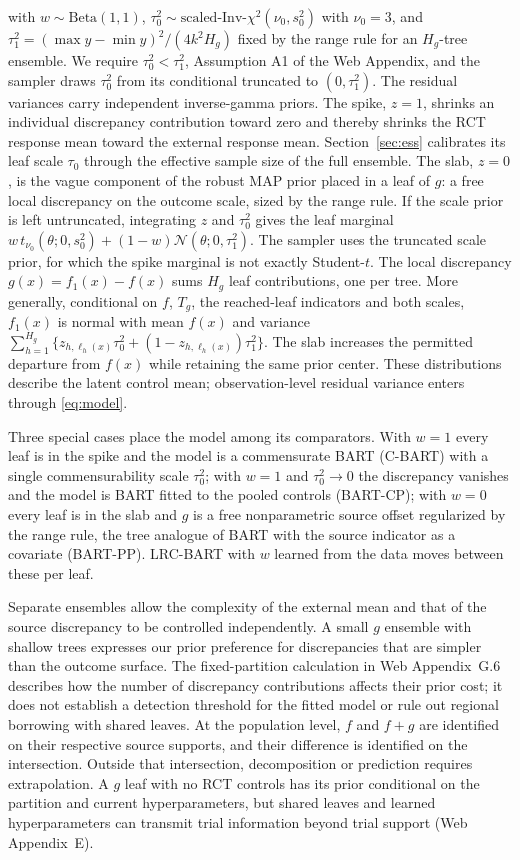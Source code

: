 \documentclass[11pt]{article}
\newcommand{\Normal}{\mathcal{N}}
\theoremstyle{definition}
\theoremstyle{plain}
\begin{document}
with $w\sim\mathrm{Beta}(1,1)$, $\tau_0^2\sim\text{scaled-Inv-}\chi^2(\nu_0,s_0^2)$ with $\nu_0=3$, and $\tau_1^2=(\max y-\min y)^2/(4k^2H_g)$ fixed by the range rule for an $H_g$-tree ensemble. We require $\tau_0^2<\tau_1^2$, Assumption A1 of the Web Appendix, and the sampler draws $\tau_0^2$ from its conditional truncated to $(0,\tau_1^2)$. The residual variances carry independent inverse-gamma priors. The spike, $z=1$, shrinks an individual discrepancy contribution toward zero and thereby shrinks the RCT response mean toward the external response mean. Section~\ref{sec:ess} calibrates its leaf scale $\tau_0$ through the effective sample size of the full ensemble. The slab, $z=0$, is the vague component of the robust MAP prior placed in a leaf of $g$: a free local discrepancy on the outcome scale, sized by the range rule. If the scale prior is left untruncated, integrating $z$ and $\tau_0^2$ gives the leaf marginal $w\,t_{\nu_0}(\theta;0,s_0^2)+(1-w)\Normal(\theta;0,\tau_1^2)$. The sampler uses the truncated scale prior, for which the spike marginal is not exactly Student-$t$. The local discrepancy $g(x)=f_1(x)-f(x)$ sums $H_g$ leaf contributions, one per tree. More generally, conditional on $f$, $T_g$, the reached-leaf indicators and both scales, $f_1(x)$ is normal with mean $f(x)$ and variance $\sum_{h=1}^{H_g}\{z_{h,\ell_h(x)}\tau_0^2+(1-z_{h,\ell_h(x)})\tau_1^2\}$. The slab increases the permitted departure from $f(x)$ while retaining the same prior center. These distributions describe the latent control mean; observation-level residual variance enters through \eqref{eq:model}.

Three special cases place the model among its comparators. With $w=1$ every leaf is in the spike and the model is a commensurate BART (C-BART) with a single commensurability scale $\tau_0^2$; with $w=1$ and $\tau_0^2\to0$ the discrepancy vanishes and the model is BART fitted to the pooled controls (BART-CP); with $w=0$ every leaf is in the slab and $g$ is a free nonparametric source offset regularized by the range rule, the tree analogue of BART with the source indicator as a covariate (BART-PP). LRC-BART with $w$ learned from the data moves between these per leaf.

Separate ensembles allow the complexity of the external mean and that of the source discrepancy to be controlled independently. A small $g$ ensemble with shallow trees expresses our prior preference for discrepancies that are simpler than the outcome surface. The fixed-partition calculation in Web Appendix~G.6 describes how the number of discrepancy contributions affects their prior cost; it does not establish a detection threshold for the fitted model or rule out regional borrowing with shared leaves. At the population level, $f$ and $f+g$ are identified on their respective source supports, and their difference is identified on the intersection. Outside that intersection, decomposition or prediction requires extrapolation. A $g$ leaf with no RCT controls has its prior conditional on the partition and current hyperparameters, but shared leaves and learned hyperparameters can transmit trial information beyond trial support (Web Appendix~E).
\end{document}
